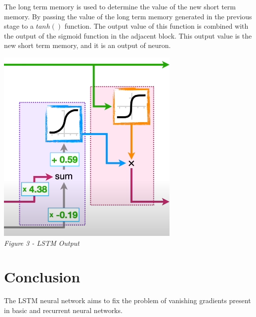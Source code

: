 \documentclass[12pt]{article}
\begin{document}
The long term memory is used to determine the value of the new short term
memory. By passing the value of the long term memory generated in the previous
stage to a $tanh()$ function. The output value of this function is combined
with the output of the sigmoid function in the adjacent block. This output
value is the new short term memory, and it is an output of neuron.

\begin{center}
    \includegraphics{OutputGate.png}\\
    \emph{Figure 3 - LSTM Output}
\end{center}

\section{Conclusion}
The LSTM neural network aims to fix the problem of vanishing gradients present
in basic and recurrent neural networks.
\end{document}

